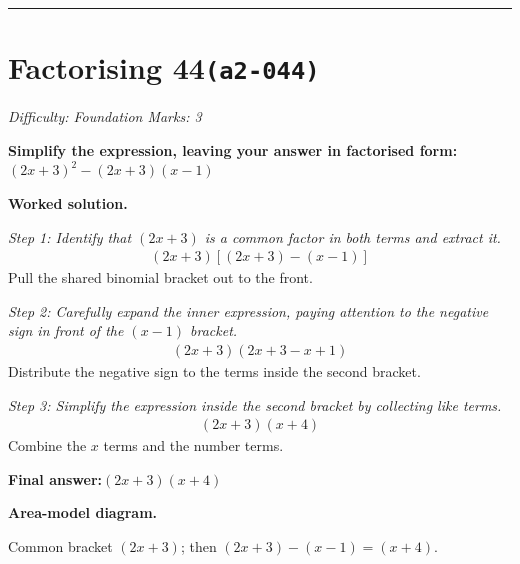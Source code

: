 \documentclass[11pt]{article}
\newcommand{\question}[1]{\par\medskip\noindent\textbf{#1}\par}
\begin{document}
\medskip\hrule

\section*{Factorising 44\quad\small\texttt{(a2-044)}}
\textit{Difficulty: Foundation \quad\textbar\quad Marks: 3}

\question{Simplify the expression, leaving your answer in factorised form: \( (2x+3)^2 - (2x+3)(x-1) \)}

\textbf{Worked solution.}

\textit{Step 1: Identify that \( (2x+3) \) is a common factor in both terms and extract it.}
\[\begin{gathered}
(2x+3)[(2x+3) - (x-1)]
\end{gathered}\]
Pull the shared binomial bracket out to the front.

\textit{Step 2: Carefully expand the inner expression, paying attention to the negative sign in front of the \( (x-1) \) bracket.}
\[\begin{gathered}
(2x+3)(2x + 3 - x + 1)
\end{gathered}\]
Distribute the negative sign to the terms inside the second bracket.

\textit{Step 3: Simplify the expression inside the second bracket by collecting like terms.}
\[\begin{gathered}
(2x+3)(x + 4)
\end{gathered}\]
Combine the \( x \) terms and the number terms.

\begin{answerbox}
\textbf{Final answer:}\quad \(\displaystyle (2x+3)(x+4)\)
\end{answerbox}
\textbf{Area-model diagram.}

\begin{center}
\end{center}
\small Common bracket $(2x+3)$; then $(2x+3)-(x-1)=(x+4)$.\normalsize
\end{document}

